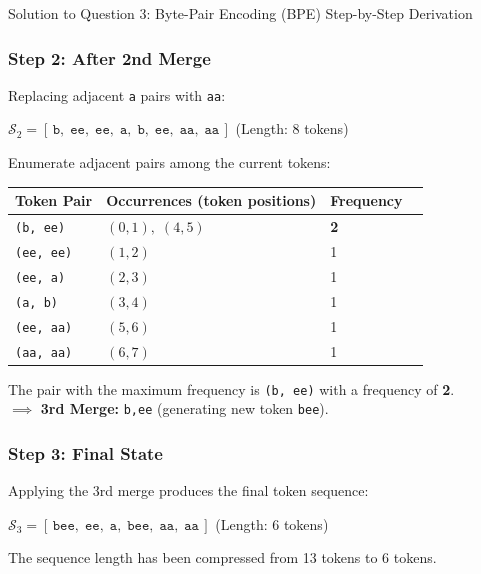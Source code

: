 \documentclass[11pt,a4paper]{article}
\begin{document}
\begin{solutionbox}{Solution to Question 3: Byte-Pair Encoding (BPE) Step-by-Step Derivation}
\subsubsection*{Step 2: After 2nd Merge}
Replacing adjacent \texttt{a} pairs with \texttt{aa}:
\begin{center}
    $\mathcal{S}_2 = [\,\texttt{b},\; \texttt{ee},\; \texttt{ee},\; \texttt{a},\; \texttt{b},\; \texttt{ee},\; \texttt{aa},\; \texttt{aa}\,]$ \quad (Length: 8 tokens)
\end{center}
Enumerate adjacent pairs among the current tokens:
\begin{center}
\small
\begin{tabular}{lll c}
\toprule
\textbf{Token Pair} & \textbf{Occurrences (token positions)} & \textbf{Frequency} \\
\midrule
\texttt{(b, ee)}   & $(0,1),\; (4,5)$ & \textbf{2} \\
\texttt{(ee, ee)}  & $(1,2)$ & 1 \\
\texttt{(ee, a)}   & $(2,3)$ & 1 \\
\texttt{(a, b)}    & $(3,4)$ & 1 \\
\texttt{(ee, aa)}  & $(5,6)$ & 1 \\
\texttt{(aa, aa)}  & $(6,7)$ & 1 \\
\bottomrule
\end{tabular}
\end{center}
The pair with the maximum frequency is \texttt{(b, ee)} with a frequency of \textbf{2}.\\
$\implies$ \textbf{3rd Merge:} \texttt{b,ee} (generating new token \texttt{bee}).

\subsubsection*{Step 3: Final State}
Applying the 3rd merge produces the final token sequence:
\begin{center}
    $\mathcal{S}_3 = [\,\texttt{bee},\; \texttt{ee},\; \texttt{a},\; \texttt{bee},\; \texttt{aa},\; \texttt{aa}\,]$ \quad (Length: 6 tokens)
\end{center}
The sequence length has been compressed from 13 tokens to 6 tokens.
\end{solutionbox}

\vspace{0.4cm}
\end{document}
